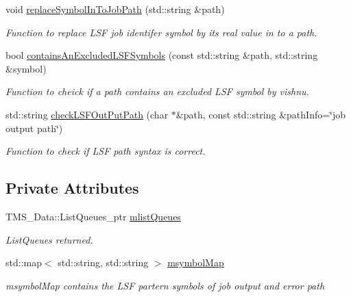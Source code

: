 \begin{DoxyCompactItemize}
void \hyperlink{classLSFServer_acd9e28377eeeef5b5bb89b4820ffcbbc}{replaceSymbolInToJobPath} (std::string \&path)
\begin{DoxyCompactList}\small\item\em Function to replace LSF job identifer symbol by its real value in to a path. \item\end{DoxyCompactList}\item 
bool \hyperlink{classLSFServer_aa277639799cd8dd06cb51364a2634b95}{containsAnExcludedLSFSymbols} (const std::string \&path, std::string \&symbol)
\begin{DoxyCompactList}\small\item\em Function to cheick if a path contains an excluded LSF symbol by vishnu. \item\end{DoxyCompactList}\item 
std::string \hyperlink{classLSFServer_aba94136a5106cbd2dbf5759568cd576f}{checkLSFOutPutPath} (char $\ast$\&path, const std::string \&pathInfo=\char`\"{}job output path\char`\"{})
\begin{DoxyCompactList}\small\item\em Function to check if LSF path syntax is correct. \item\end{DoxyCompactList}\end{DoxyCompactItemize}
\subsection*{Private Attributes}
\begin{DoxyCompactItemize}
\item 
\hypertarget{classLSFServer_a9b30661795410d99d1856e64fc2b44fa}{
TMS\_\-Data::ListQueues\_\-ptr \hyperlink{classLSFServer_a9b30661795410d99d1856e64fc2b44fa}{mlistQueues}}
\label{classLSFServer_a9b30661795410d99d1856e64fc2b44fa}

\begin{DoxyCompactList}\small\item\em ListQueues returned. \item\end{DoxyCompactList}\item 
\hypertarget{classLSFServer_aba0998934a0fe71d22b3eb0497234134}{
std::map$<$ std::string, std::string $>$ \hyperlink{classLSFServer_aba0998934a0fe71d22b3eb0497234134}{msymbolMap}}
\label{classLSFServer_aba0998934a0fe71d22b3eb0497234134}

\begin{DoxyCompactList}\small\item\em msymbolMap contains the LSF partern symbols of job output and error path \item\end{DoxyCompactList}\end{DoxyCompactItemize}


